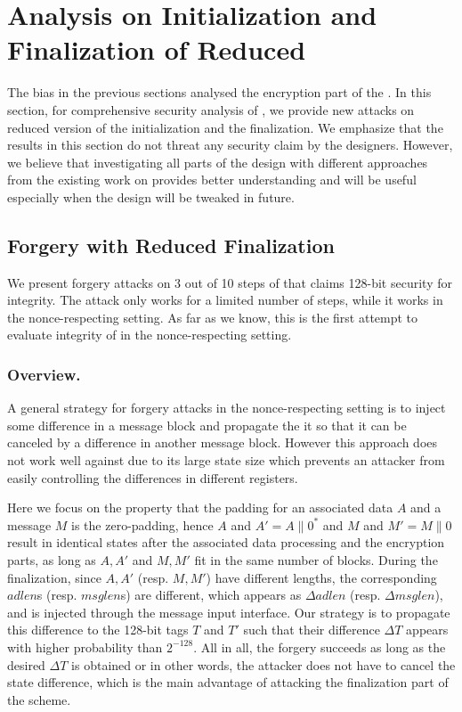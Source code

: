 
\section{Analysis on Initialization and Finalization of Reduced \MORUS}
\label{sec/IniFin}

The bias in the previous sections analysed the encryption part of the \MORUS. In this section, for comprehensive security analysis of \MORUS, we provide new attacks on reduced version of the initialization and the finalization. We emphasize that the results in this section do not threat any security claim by the designers. However, we believe that investigating all parts of the design with different approaches from the existing work on \MORUS provides better understanding and will be useful especially when the design will be tweaked in future.

\subsection{Forgery with Reduced Finalization}
\label{subsec/Fin}
We present forgery attacks on 3 out of 10 steps of \MORUS[1280] that claims 128-bit security for integrity. The attack only works for a limited number of steps, while it works in the nonce-respecting setting. As far as we know, this is the first attempt to evaluate integrity of \MORUS in the nonce-respecting setting.

\subsubsection{Overview.}
A general strategy for forgery attacks in the nonce-respecting setting is to inject some difference in a message block and propagate the it so that it can be canceled by a difference in another message block. However this approach does not work well against \MORUS due to its large state size which prevents an attacker from easily controlling the differences in different registers. 

Here we focus on the property that the padding for an associated data $A$ and a message $M$ is the zero-padding, hence $A$ and $A'=A\|0^*$ and $M$ and $M'=M\|0$ result in identical states after the associated data processing and the encryption parts, as long as $A,A'$ and $M,M'$ fit in the same number of blocks. During the finalization, since $A,A'$ (resp. $M,M'$) have different lengths, the corresponding $adlen$s (resp. $msglen$s) are different, which appears as $\Delta adlen$ (resp. $\Delta msglen$), and is injected through the message input interface. Our strategy is to propagate this difference to the 128-bit tags $T$ and $T'$ such that their difference $\Delta T$ appears with higher probability than $2^{-128}$. All in all, the forgery succeeds as long as the desired $\Delta T$ is obtained or in other words, the attacker does not have to cancel the state difference, which is the main advantage of attacking the finalization part of the scheme. 

